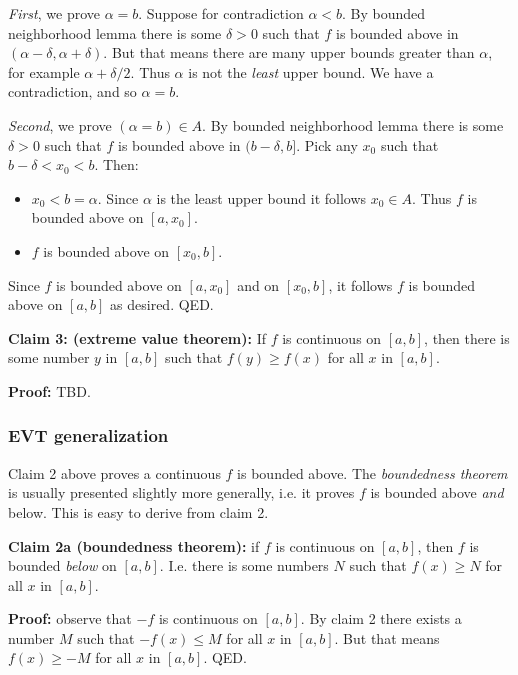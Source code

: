 \textit{First}, we prove $\alpha=b$. Suppose for contradiction $\alpha<b$. By
bounded neighborhood lemma there is some $\delta>0$ such that $f$ is
bounded above in $(\alpha-\delta, \alpha+\delta)$. But that means there are many upper
bounds greater than $\alpha$, for example $\alpha+\delta/2$. Thus $\alpha$ is not the
\textit{least} upper bound. We have a contradiction, and so $\alpha=b$.

\vs

\textit{Second}, we prove $(\alpha=b)\in A$. By bounded neighborhood lemma
there is some $\delta>0$ such that $f$ is bounded above in $(b-\delta, b]$. Pick
any $x_{0}$ such that $b-\delta<x_{0}<b$. Then:
\begin{itemize}
\item $x_{0}<b=\alpha$. Since $\alpha$ is the least upper bound it follows
  $x_{0}\in A$. Thus $f$ is bounded above on $[a,x_{0}]$.
\item $f$ is bounded above on $[x_{0}, b]$.
\end{itemize}
Since $f$ is bounded above on $[a,x_{0}]$ and on $[x_{0}, b]$, it
follows $f$ is bounded above on $[a,b]$ as desired. QED.

\vs

\textbf{Claim 3: (extreme value theorem):} If $f$ is continuous on
$[a,b]$, then there is some number $y$ in $[a,b]$ such that
$f(y)\geq f(x)$ for all $x$ in $[a,b]$.

\vs

\textbf{Proof:} TBD.

\subsubsection*{EVT generalization}

Claim 2 above proves a continuous $f$ is bounded above. The
\textit{boundedness theorem} is usually presented slightly more
generally, i.e. it proves $f$ is bounded above \textit{and} below.
This is easy to derive from claim 2.

\vs

\textbf{Claim 2a (boundedness theorem):} if $f$ is continuous on
$[a,b]$, then $f$ is bounded \textit{below} on $[a,b]$. I.e. there is
some numbers $N$ such that $f(x)\geq N$ for all $x$ in $[a,b]$.

\vs

\textbf{Proof:} observe that $-f$ is continuous on $[a,b]$. By claim 2
there exists a number $M$ such that $-f(x)\leq M$ for all $x$ in
$[a,b]$. But that means $f(x)\geq -M$ for all $x$ in $[a,b]$. QED.

